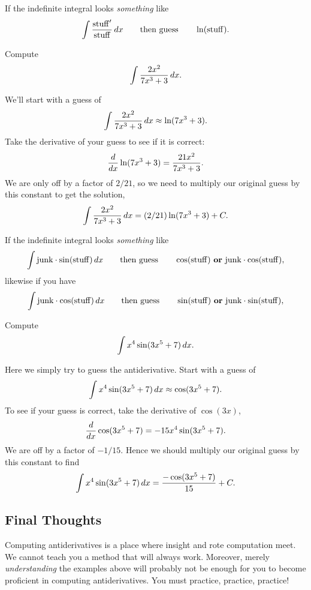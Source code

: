 \begin{template}\label{template:lnchain}
If the indefinite integral looks \emph{something} like
\[
\int \frac{\mathrm{stuff}'}{\mathrm{stuff}}\, d x \qquad\text{then guess}\qquad\ln(\mathrm{stuff}).
\]
\end{template}

\begin{example}
Compute
\[
\int \frac{2x^2}{7x^3 + 3} \, d x.
\]
\end{example}

\begin{solution} We'll start with a guess of
\[
\int \frac{2x^2}{7x^3 + 3} \, d x \approx \ln(7x^3+3).
\]
Take the derivative of your guess to see if it is correct:
\[
\frac{d}{dx} \ln(7x^3+3) = \frac{21x^2}{7x^3 + 3}.
\]
We are only off by a factor of $2/21$, so we need to multiply our
original guess by this constant to get the solution,
\[
\int \frac{2x^2}{7x^3 + 3} \, d x = (2/21)\ln(7x^3+3)+C.
\]
\end{solution}




\begin{template}\label{template:trigchain}
If the indefinite integral looks \emph{something} like
\[
\int \mathrm{junk}\cdot \sin(\mathrm{stuff}) \, d x \qquad\text{then
  guess}\qquad \cos(\mathrm{stuff}) \text{ \textbf{or} }\mathrm{junk}
\cdot \cos(\mathrm{stuff}),
\]
likewise if you have 
\[
\int \mathrm{junk}\cdot \cos(\mathrm{stuff}) \, d x \qquad\text{then
  guess}\qquad \sin(\mathrm{stuff}) \text{ \textbf{or} }\mathrm{junk}
\cdot \sin(\mathrm{stuff}),
\]
\end{template}



\begin{example}
Compute
\[
\int x^4\sin(3x^5+7) \, d x.
\]
\end{example}


\begin{solution}
Here we simply try to guess the antiderivative. Start with a guess of
\[
\int x^4\sin(3x^5+7)\, d x \approx \cos(3x^5+7).
\]
To see if your guess is correct, take the derivative of $\cos(3x)$,
\[
\frac{d}{dx} \cos(3x^5+7) = -15x^4\sin(3x^5+7).
\]
We are off by a factor of $-1/15$. Hence we should multiply our
original guess by this constant to find
\[
\int x^4\sin(3x^5+7) \, d x = \frac{-\cos(3x^5+7)}{15} + C.
\]
\end{solution}





\subsection*{Final Thoughts}
Computing antiderivatives is a place where insight and rote
computation meet. We cannot teach you a method that will always
work. Moreover, merely \emph{understanding} the examples above will
probably not be enough for you to become proficient in computing
antiderivatives. You must practice, practice, practice!




